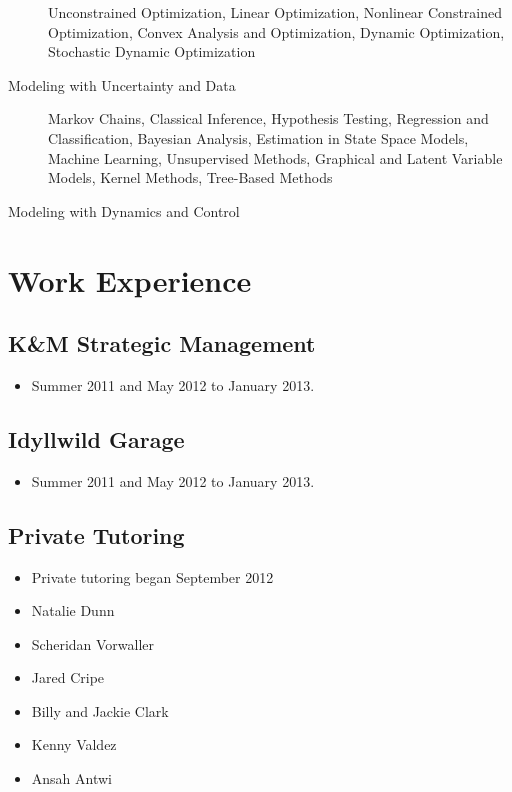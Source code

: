 \documentclass[11pt, letterpaper]{article}
\begin{document}
\begin{description}
          Unconstrained Optimization,
          Linear Optimization,
          Nonlinear Constrained Optimization,
          Convex Analysis and Optimization,
          Dynamic Optimization,
          Stochastic Dynamic Optimization
        \item [Modeling with Uncertainty and Data]
          Markov Chains,
          Classical Inference,
          Hypothesis Testing,
          Regression and Classification,
          Bayesian Analysis,
          Estimation in State Space Models,
          Machine Learning,
          Unsupervised Methods,
          Graphical and Latent Variable Models,
          Kernel Methods,
          Tree-Based Methods
        \item [Modeling with Dynamics and Control]

      \end{description}

\section*{
  Work Experience
}
  \subsection*{K\&M Strategic Management}
    \begin{itemize}
      \item Summer 2011 and May 2012 to January 2013.
    \end{itemize}
  \subsection*{Idyllwild Garage}
    \begin{itemize}
      \item Summer 2011 and May 2012 to January 2013.
    \end{itemize}
  \subsection*{Private Tutoring}
    \begin{itemize}
      \item Private tutoring began September 2012
      \item Natalie Dunn
      \item Scheridan Vorwaller
      \item Jared Cripe
      \item Billy and Jackie Clark
      \item Kenny Valdez
      \item Ansah Antwi
    \end{itemize}
\end{document}
